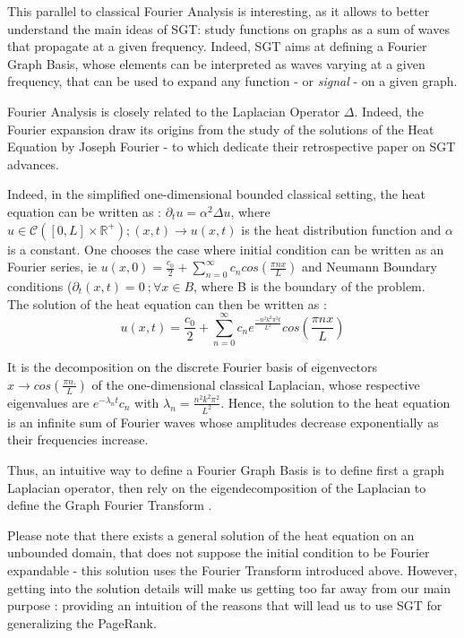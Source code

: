 \documentclass{article}
\begin{document}
This parallel to classical Fourier Analysis is interesting, as it allows to better understand the main ideas of SGT: study functions on graphs as a sum of waves that propagate at a given frequency. Indeed, SGT aims at defining a Fourier Graph Basis, whose elements can be interpreted as waves varying at a given frequency, that can be used to expand any function - or \textit{signal} - on a given graph.

Fourier Analysis is closely related to the Laplacian Operator $\Delta$. Indeed, the Fourier expansion draw its origins from the study of the solutions of the Heat Equation by Joseph Fourier - to which \cite{ricaud_borgnat_tremblay_gonçalves_vandergheynst_2019} dedicate their retrospective paper on SGT advances. 

Indeed, in the simplified one-dimensional bounded classical setting, the heat equation can be written as : $\partial_t u = \alpha^2 \Delta u$, where $u \in \mathcal{C}([0,L]\times \mathbb{R}^+) ; (x,t) \rightarrow u(x,t)$ is the heat distribution function and $\alpha$ is a constant. One chooses the case where initial condition can be written as an Fourier series, ie $u(x, 0) = \frac{c_0}{2} + \sum_{n=0}^{\infty} c_n cos(\frac{\pi n x}{L})$ and Neumann Boundary conditions ($\partial_t(x,t)=0 \ ; \forall x \in B$, where B is the boundary of the problem.
\\
The solution of the heat equation can then be written as :
\begin{equation}\label{eq:heat_eq_classical_solution}
    u(x,t) = \frac{c_0}{2} + \sum_{n=0}^{\infty} c_n e^{\frac{-n^2 k^2 \pi^2 t}{L^2}} cos(\frac{\pi n x}{L})
\end{equation}

It is the decomposition on the discrete Fourier basis of eigenvectors $x \rightarrow cos(\frac{\pi n .}{L})$ of the one-dimensional classical Laplacian, whose respective eigenvalues are $e^{-\lambda_n t} c_n$ with $\lambda_n = \frac{n^2 k^2 \pi^2}{L^2}$. Hence, the solution to the heat equation is an infinite sum of Fourier waves whose amplitudes decrease exponentially as their frequencies increase.

Thus, an intuitive way to define a Fourier Graph Basis is to define first a graph Laplacian operator, then rely on the eigendecomposition of the Laplacian to define the Graph Fourier Transform \cite{shuman_narang_frossard_ortega_vandergheynst_2013, ricaud_borgnat_tremblay_gonçalves_vandergheynst_2019}.

Please note that there exists a general solution of the heat equation on an unbounded domain, that does not suppose the initial condition to be Fourier expandable - this solution uses the Fourier Transform introduced above. However, getting into the solution details will make us getting too far away from our main purpose : providing an intuition of the reasons that will lead us to use SGT for generalizing the PageRank.
\end{document}
